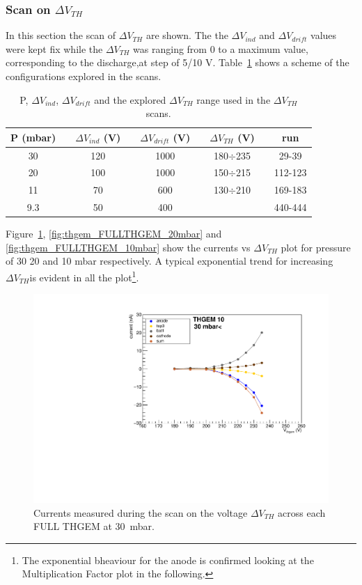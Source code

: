 \documentclass[a4paper, 11 pt]{report}
\newcommand{\Vind}{$\Delta V_{ind}$}
\newcommand{\Vthgem}{$\Delta V_{TH}$}
\newcommand{\Vdrift}{$ \Delta V_{drift}$}
\begin{document}
\subsubsection{Scan on \Vthgem}
In this section the scan of \Vthgem{} are shown. The the \Vind{} and \Vdrift{} values were kept 
fix while the \Vthgem{} was ranging from 0 to a maximum value, corresponding to the discharge,at 
step of 5/10 V. 
Table~\ref{tab:FULLTHGEM_vthgem} shows a scheme of the configurations explored in the scans.
\begin{table} [!h]
	\begin{center}
		\renewcommand{\arraystretch}{1.2}
		\begin{tabular} {ccccccccc}
			P (mbar) & & \Vind{} (V) & & \Vdrift{} (V) & & \Vthgem{} (V) & & run\\
			\toprule[0.1em]
			30	& &	120	& &	1000	& & 180$\div$235 & & 29-39 \\
			20	& &	100	& & 1000	& & 150$\div$215 & & 112-123 \\
			11	& & 70	& & 600		& & 130$\div$210 & & 169-183 \\		
			9.3 & & 50  & & 400     & &              & & 440-444 \\   
			\bottomrule[0.1em]
		\end{tabular}
	\end{center}
	\caption{P, \Vind{}, \Vdrift{} and the explored \Vthgem{} range used in the \Vthgem{} scans.} 
	\label{tab:FULLTHGEM_vthgem}
\end{table}
Figure~\ref{fig:thgem_FULLTHGEM_30mbar}, \ref{fig:thgem_FULLTHGEM_20mbar} and 
\ref{fig:thgem_FULLTHGEM_10mbar} show the currents vs \Vthgem{} plot for pressure of 30 20 and 10 
mbar respectively. A typical exponential trend for increasing \Vthgem is evident in all the 
plot\footnote{The exponential bheaviour for the anode is confirmed looking at the Multiplication 
Factor plot in the following.}.
\begin{figure}[!t]
	\centering
	\includegraphics[width=\textwidth]{Immagini/thgemScan_THGEM10_30mbar.pdf}
	\caption{Currents measured during the scan on the voltage \Vthgem{} across each FULL THGEM 
	at 30~mbar.}
	\label{fig:thgem_FULLTHGEM_30mbar}
\end{figure}
\end{document}
